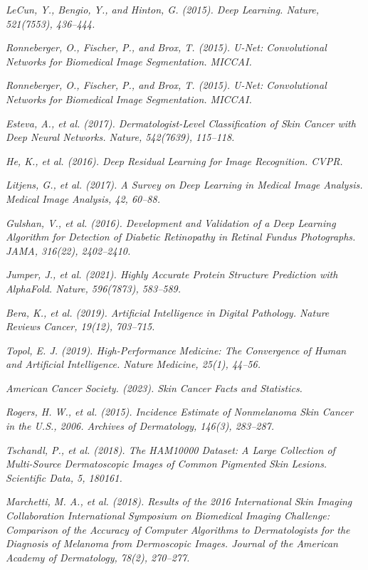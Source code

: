 \documentclass[a4paper,12pt]{report}
\begin{document}
\begin{spacing}{1.5}
\begin{thebibliography}{99}
 \emph{LeCun, Y., Bengio, Y., and Hinton, G. (2015). Deep Learning. Nature, 521(7553), 436–444.}

 \emph{Ronneberger, O., Fischer, P., and Brox, T. (2015). U-Net: Convolutional Networks for Biomedical Image Segmentation. MICCAI.}

 \emph{Ronneberger, O., Fischer, P., and Brox, T. (2015). U-Net: Convolutional Networks for Biomedical Image Segmentation. MICCAI.}

 \emph{Esteva, A., et al. (2017). Dermatologist-Level Classification of Skin Cancer with Deep Neural Networks. Nature, 542(7639), 115–118.}

 \emph{He, K., et al. (2016). Deep Residual Learning for Image Recognition. CVPR.}

 \emph{Litjens, G., et al. (2017). A Survey on Deep Learning in Medical Image Analysis. Medical Image Analysis, 42, 60–88.}

 \emph{Gulshan, V., et al. (2016). Development and Validation of a Deep Learning Algorithm for Detection of Diabetic Retinopathy in Retinal Fundus Photographs. JAMA, 316(22), 2402–2410.}

 \emph{Jumper, J., et al. (2021). Highly Accurate Protein Structure Prediction with AlphaFold. Nature, 596(7873), 583–589.}

 \emph{Bera, K., et al. (2019). Artificial Intelligence in Digital Pathology. Nature Reviews Cancer, 19(12), 703–715.}

 \emph{Topol, E. J. (2019). High-Performance Medicine: The Convergence of Human and Artificial Intelligence. Nature Medicine, 25(1), 44–56.}

 \emph{American Cancer Society. (2023). Skin Cancer Facts and Statistics.}

 \emph{Rogers, H. W., et al. (2015). Incidence Estimate of Nonmelanoma Skin Cancer in the U.S., 2006. Archives of Dermatology, 146(3), 283–287.}

 \emph{Tschandl, P., et al. (2018). The HAM10000 Dataset: A Large Collection of Multi-Source Dermatoscopic Images of Common Pigmented Skin Lesions. Scientific Data, 5, 180161.}

 \emph{Marchetti, M. A., et al. (2018). Results of the 2016 International Skin Imaging Collaboration International Symposium on Biomedical Imaging Challenge: Comparison of the Accuracy of Computer Algorithms to Dermatologists for the Diagnosis of Melanoma from Dermoscopic Images. Journal of the American Academy of Dermatology, 78(2), 270–277.}


\end{thebibliography}
\end{spacing}
\end{document}
